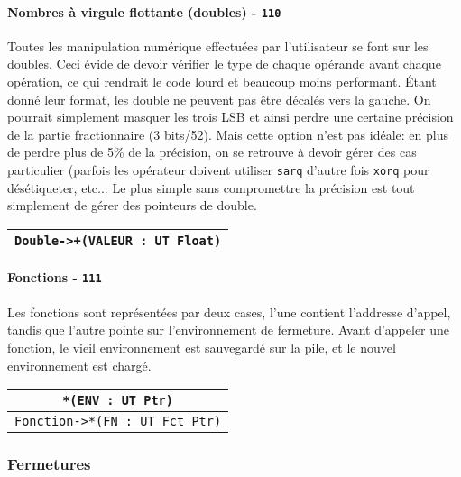 \documentclass{article}
\begin{document}
\paragraph{Nombres à virgule flottante (doubles) - \texttt{110}}
Toutes les manipulation numérique effectuées par l'utilisateur se font sur les doubles. Ceci évide de devoir vérifier le type de chaque opérande avant chaque opération, ce qui rendrait le code lourd et beaucoup moins performant. Étant donné leur format, les double ne peuvent pas être décalés vers la gauche. On pourrait simplement masquer les trois LSB et ainsi perdre une certaine précision de la partie fractionnaire (3 bits/52). Mais cette option n'est pas idéale: en plus de perdre plus de 5\%{} de la précision, on se retrouve à devoir gérer des cas particulier (parfois les opérateur doivent utiliser \texttt{sarq} d'autre fois \texttt{xorq} pour désétiqueter, etc... Le plus simple sans compromettre la précision est tout simplement de gérer des pointeurs de double.

\begin{center}
\begin{tabular}{|c|}
    \hline
    \texttt{Double->+(VALEUR : UT Float)}\\
    \hline
\end{tabular}
\end{center}

\paragraph{Fonctions - \texttt{111}}
Les fonctions sont représentées par deux cases, l'une contient l'addresse d'appel, tandis que l'autre pointe sur l'environnement de fermeture. Avant d'appeler une fonction, le vieil environnement est sauvegardé sur la pile, et le nouvel environnement est chargé.

\begin{center}
\begin{tabular}{|c|}
    \hline
    \texttt{*(ENV : UT Ptr)}\\
    \hline
    \texttt{Fonction->*(FN : UT Fct Ptr)}\\
    \hline
\end{tabular}
\end{center}

\subsubsection{Fermetures}
\end{document}
